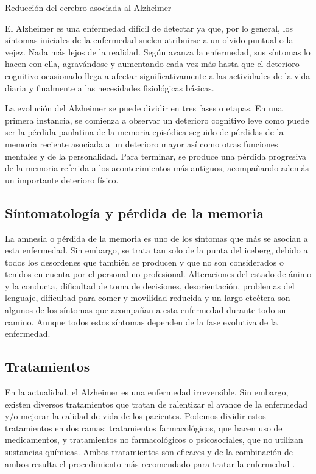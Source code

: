 %
{Reducción del cerebro asociada al Alzheimer  \citep{mattson2004pathways}}

El Alzheimer es una enfermedad difícil de detectar ya que, por lo general, los síntomas iniciales de la enfermedad suelen atribuirse a un olvido puntual o la vejez. Nada más lejos de la realidad. Según avanza la enfermedad, sus síntomas lo hacen con ella, agravándose y aumentando cada vez más hasta que el deterioro cognitivo ocasionado llega a afectar significativamente a las actividades de la vida diaria y finalmente a las necesidades fisiológicas básicas.


La evolución del Alzheimer se puede dividir en tres fases o etapas. En una primera instancia, se comienza a observar un deterioro cognitivo leve como puede ser la pérdida paulatina de la memoria episódica seguido de pérdidas de la memoria reciente asociada a un deterioro mayor así como otras funciones mentales y de la personalidad. Para terminar, se produce una pérdida progresiva de la memoria referida a los acontecimientos más antiguos, acompañando además un importante deterioro físico.


\subsection{Síntomatología y pérdida de la memoria}
La amnesia o pérdida de la memoria es uno de los síntomas que más se asocian a esta enfermedad. Sin embargo, se trata tan solo de la punta del iceberg, debido a todos los desordenes que también se producen y que no son considerados o tenidos en cuenta por el personal no profesional.  Alteraciones del estado de ánimo y la conducta, dificultad de toma de decisiones, desorientación, problemas del lenguaje, dificultad para comer y movilidad reducida y un largo etcétera son algunos de los síntomas que acompañan a esta enfermedad durante todo su camino. Aunque todos estos síntomas dependen de la fase evolutiva de la enfermedad.


\subsection{Tratamientos}
En la actualidad, el Alzheimer es una enfermedad irreversible. Sin embargo, existen diversos tratamientos que tratan de ralentizar el avance de la enfermedad y/o mejorar la calidad de vida de los pacientes. Podemos dividir estos tratamientos en dos ramas: tratamientos farmacológicos, que hacen uso de medicamentos, y tratamientos no farmacológicos o psicosociales, que no utilizan sustancias químicas. Ambos tratamientos son eficaces y de la combinación de ambos resulta el procedimiento más recomendado para tratar la enfermedad \citep{romano2007enfermedad}.


